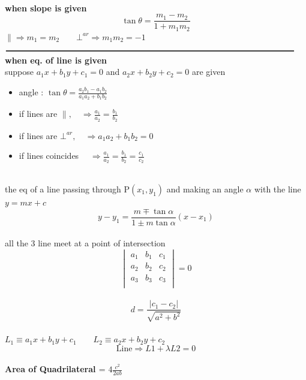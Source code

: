 \documentclass[11pt,a4paper,landscape]{article}
\begin{document}
\begin{multicols*}{3}
\vfill\null
\columnbreak
%
%
%
{\bfseries {}}\\
{\bfseries {when slope is given }}
$$\tan\theta = \frac{m_1-m_2}{1+m_1m_2}$$
$\parallel \Rightarrow m_1 = m_2 \qquad \bot^{ar}  \Rightarrow m_1 m_2 = -1 $\\
%
$\rule{\linewidth}{1pt}$\\
%
{\bfseries {when eq. of line is given }}\\
suppose $a_1x+b_1y+c_1=0$ and $a_2 x+b_2 y+ c_2=0$ are given
\begin{itemize}
	\item angle :  $ \tan\theta = \frac{a_2 b_1 - a_1 b_2}{a_1 a_2+b_1 b_2}$\\
	\item if lines are $\parallel, \quad \Rightarrow \frac{a_1}{a_2} = \frac{b_1}{b_2}$
	\item if lines are $\bot^{ar}, \quad \Rightarrow a_1 a_2 + b_1 b_2 = 0$
	\item if lines coincides $\quad \Rightarrow \frac{a_1}{a_2}=\frac{b_1}{b_2}=\frac{c_1}{c_2}$
\end{itemize}
%
%
%
{\bfseries {}}\\
the eq of a line passing through P$(x_1,y_1)$ and making an angle $\alpha$ with the line $y= mx+c$\\
$$
y-y_1 = \frac{m\mp \tan\alpha}{1\pm m\tan\alpha}(x-x_1)
$$
{\bfseries {}}\\
all the 3 line meet at a point of intersection 
$$
	\begin{vmatrix}
	a_1 & b_1 & c_1\\
	a_2 & b_2 & c_2\\
	a_3 & b_3 & c_3\\
	\end{vmatrix}
	= 0
$$
%
%
%
{\bfseries {}}\\
$$
	d = \frac{| c_1 - c_2|}{\sqrt{a^2 + b^2}}
$$
\vfill\null
\columnbreak
%
%
%
{\bfseries {}}\\
$L_1 \equiv a_1 x+b_1 y+c_1 \qquad  L_2 \equiv a_2 x+b_2 y+c_2 $
$$ \textrm{Line} \Rightarrow L1 + \lambda L2 = 0$$
%
%
%
{\bfseries {}}\\
{\bfseries { Area of Quadrilateral }}  = $ 4 \frac{c^2}{2ab}$\\ \\

\end{multicols*}
\end{document}
